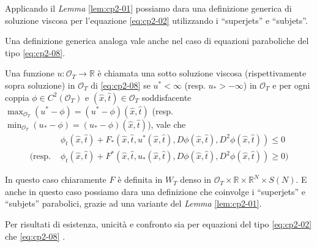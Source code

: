\begin{osservazione}
Applicando il \emph{Lemma} \ref{lem:cp2-01} possiamo dara una definizione generica di soluzione viscosa per l'equazione \eqref{eq:cp2-02} utilizzando i ``superjets'' e ``subjets''.
\end{osservazione}
Una definizione generica analoga vale anche nel caso di equazioni paraboliche del tipo \eqref{eq:cp2-08}.
\begin{definizione}
\label{def:cp2-02}
Una funzione $u:\mathcal{O}_T\to\mathbb{R}$ è chiamata una sotto soluzione viscosa (rispettivamente sopra soluzione) in $\mathcal{O}_T$ di \eqref{eq:cp2-08} se $u^*<\infty$ (resp. $u_*>-\infty$) in $\mathcal{O}_T$ e per ogni coppia $\phi\in C^2(\mathcal{O}_T)$ e $(\hat{x},\hat{t})\in\mathcal{O}_T$ soddisfacente $\max_{\mathcal{O}_T}(u^*-\phi)=(u^*-\phi)(\hat{x},\hat{t})$ (resp. $\min_{\mathcal{O}_T}(u_*-\phi)=(u_*-\phi)(\hat{x},\hat{t})$), vale che
\[
\begin{aligned}
&\phi_t(\hat{x},\hat{t}) + F_*(\hat{x},\hat{t},u^*(\hat{x},\hat{t}),D\phi(\hat{x},\hat{t}),D^2\phi(\hat{x},\hat{t}))\leq 0 \\
(\text{resp. }&\phi_t(\hat{x},\hat{t})+F^*(\hat{x},\hat{t},u_*(\hat{x},\hat{t}),D\phi(\hat{x},\hat{t}),D^2\phi(\hat{x},\hat{t}))\geq 0)
\end{aligned}
\]
\end{definizione}
\begin{osservazione}
In questo caso chiaramente $F$ è definita in $W_T$ denso in $\mathcal{O}_T\times\mathbb{R}\times\mathbb{R}^N\times S(N)$. E anche in questo caso possiamo dara una definizione che coinvolge i ``superjets'' e ``subjets'' parabolici, grazie ad una variante del \emph{Lemma} \ref{lem:cp2-01}. 
\end{osservazione}
Per risultati di esistenza, unicità e confronto sia per equazioni del tipo \eqref{eq:cp2-02} che \eqref{eq:cp2-08} \cite[vedi][]{crand:lion,giga:main,yun:giga}.
%
%
%
